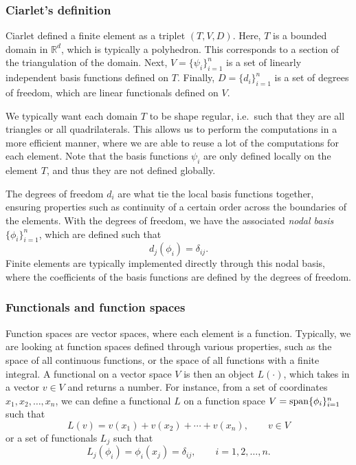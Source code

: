 \subsubsection{Ciarlet's definition}
Ciarlet defined a finite element as a triplet $(T, V, D)$.
Here, $T$ is a bounded domain in $\mathbb{R}^d$, which is typically a polyhedron.
This corresponds to a section of the triangulation of the domain.
Next, $V = \{\psi_i\}_{i = 1}^n$ is a set of linearly independent basis functions defined on $T$.
Finally, $D = \{d_i\}_{i = 1}^n$ is a set of degrees of freedom, which are linear functionals defined on $V$.

We typically want each domain $T$ to be shape regular, i.e.\ such that they are all triangles or all quadrilaterals.
This allows us to perform the computations in a more efficient manner, where we are able to reuse a lot of the computations for each element.
Note that the basis functions $\psi_i$ are only defined locally on the element $T$, and thus they are not defined globally.

The degrees of freedom $d_i$ are what tie the local basis functions together, ensuring properties such as continuity of a certain order across the boundaries of the elements.
With the degrees of freedom, we have the associated \textit{nodal basis} $\{\phi_{i}\}_{i = 1}^n$, which are defined such that
\begin{equation}
    d_j(\phi_i) = \delta_{ij}.
\end{equation}
Finite elements are typically implemented directly through this nodal basis, where the coefficients of the basis functions are defined by the degrees of freedom.

\subsubsection{Functionals and function spaces}
Function spaces are vector spaces, where each element is a function.
Typically, we are looking at function spaces defined through various properties, such as the space of all continuous functions, or the space of all functions with a finite integral.
A functional on a vector space $V$ is then an object $L(\cdot)$, which takes in a vector $v \in V$ and returns a number.
For instance, from a set of coordinates $x_1, x_2, \ldots, x_n$, we can define a functional $L$ on a function space $V = \operatorname{span}\{\phi_i\}_{i=1}^n$ such that
\begin{equation}
    L(v) = v(x_1) + v(x_2) + \cdots + v(x_n),
    \qquad
    v \in V
\end{equation}
or a set of functionals $L_j$ such that
\begin{equation}
    L_j(\phi_i) = \phi_i(x_j) = \delta_{ij},
    \qquad
    i = 1, 2, \ldots, n.
\end{equation}

